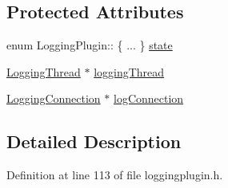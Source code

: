 \subsection*{Protected Attributes}
\begin{DoxyCompactItemize}
\item 
enum Logging\-Plugin\-:: \{ ... \}  \hyperlink{class_logging_plugin_afed116d3400891dfe3abbe8ab2865285}{state}
\item 
\hyperlink{class_logging_thread}{Logging\-Thread} $\ast$ \hyperlink{class_logging_plugin_a0e2c95cb5a17fd852e075212993e4ba3}{logging\-Thread}
\item 
\hyperlink{class_logging_connection}{Logging\-Connection} $\ast$ \hyperlink{class_logging_plugin_aa8ec59a3e026606b2e503ff2644c9e64}{log\-Connection}
\end{DoxyCompactItemize}


\subsection{Detailed Description}


Definition at line 113 of file loggingplugin.\-h.



